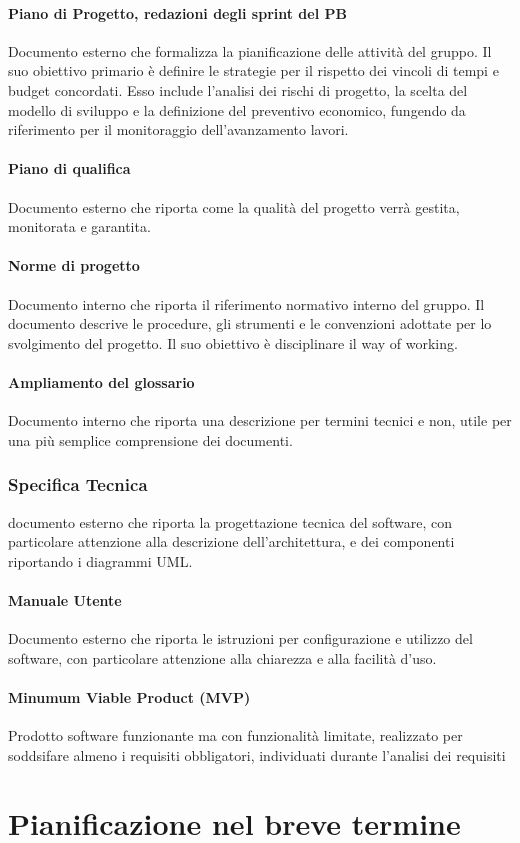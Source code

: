 \documentclass[a4paper, 11pt]{article}
\newcommand{\subsubsubsection}[1]{\paragraph{#1}}
\begin{document}
\subsubsubsection{Piano di Progetto, redazioni degli sprint del PB}
Documento esterno che formalizza la pianificazione delle attività del gruppo. Il suo obiettivo primario è definire le strategie per il rispetto dei vincoli di tempi e budget concordati.
Esso include l'analisi dei rischi di progetto, la scelta del modello di sviluppo e la definizione del preventivo economico, fungendo da riferimento per il monitoraggio dell'avanzamento lavori.

\subsubsubsection{Piano di qualifica}
Documento esterno che riporta come la qualità del progetto verrà gestita, monitorata e garantita.

\subsubsubsection{Norme di progetto}
Documento interno che riporta il riferimento normativo interno del gruppo. Il documento descrive le procedure, gli strumenti e le convenzioni adottate per lo svolgimento del progetto. Il suo obiettivo è disciplinare il way of working.

\subsubsubsection{Ampliamento del glossario}
Documento interno che riporta una descrizione per termini tecnici e non, utile per una più semplice comprensione dei documenti.

\subsubsection{Specifica Tecnica}
documento esterno che riporta la progettazione tecnica del software, con particolare attenzione alla descrizione dell'architettura, e dei componenti riportando i diagrammi UML.

\subsubsubsection{Manuale Utente}
Documento esterno che riporta le istruzioni per configurazione e utilizzo del software, con particolare attenzione alla chiarezza e alla facilità d'uso.

\subsubsubsection{Minumum Viable Product (MVP)}
Prodotto software funzionante ma con funzionalità limitate, realizzato per soddsifare almeno i requisiti obbligatori, individuati durante l'analisi dei requisiti


\newpage

\section{Pianificazione nel breve termine} \label{pianificazione_breve_termine}
\end{document}
